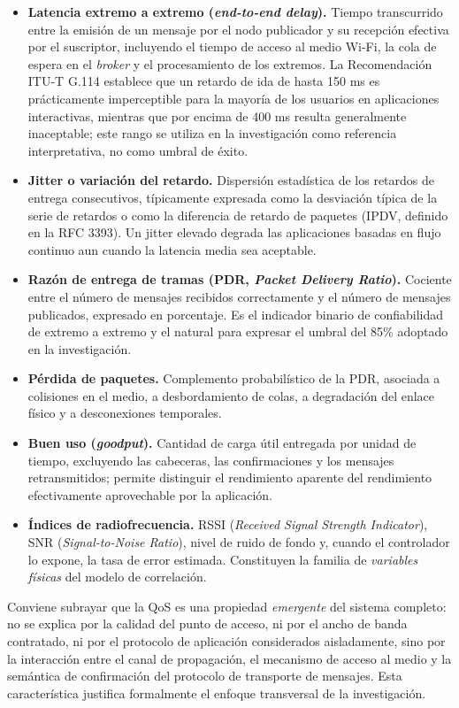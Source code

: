 \documentclass[
  12pt,
]{article}
\providecommand{\tightlist}{%
  \setlength{\itemsep}{0pt}\setlength{\parskip}{0pt}}
\begin{document}
\begin{itemize}
\tightlist
\item
  \textbf{Latencia extremo a extremo (\emph{end-to-end delay}).} Tiempo
  transcurrido entre la emisión de un mensaje por el nodo publicador y
  su recepción efectiva por el suscriptor, incluyendo el tiempo de
  acceso al medio Wi-Fi, la cola de espera en el \emph{broker} y el
  procesamiento de los extremos. La Recomendación ITU-T G.114 establece
  que un retardo de ida de hasta 150 ms es prácticamente imperceptible
  para la mayoría de los usuarios en aplicaciones interactivas, mientras
  que por encima de 400 ms resulta generalmente inaceptable; este rango
  se utiliza en la investigación como referencia interpretativa, no como
  umbral de éxito.
\item
  \textbf{Jitter o variación del retardo.} Dispersión estadística de los
  retardos de entrega consecutivos, típicamente expresada como la
  desviación típica de la serie de retardos o como la diferencia de
  retardo de paquetes (IPDV, definido en la RFC 3393). Un jitter elevado
  degrada las aplicaciones basadas en flujo continuo aun cuando la
  latencia media sea aceptable.
\item
  \textbf{Razón de entrega de tramas (PDR, \emph{Packet Delivery
  Ratio}).} Cociente entre el número de mensajes recibidos correctamente
  y el número de mensajes publicados, expresado en porcentaje. Es el
  indicador binario de confiabilidad de extremo a extremo y el natural
  para expresar el umbral del 85\% adoptado en la investigación.
\item
  \textbf{Pérdida de paquetes.} Complemento probabilístico de la PDR,
  asociada a colisiones en el medio, a desbordamiento de colas, a
  degradación del enlace físico y a desconexiones temporales.
\item
  \textbf{Buen uso (\emph{goodput}).} Cantidad de carga útil entregada
  por unidad de tiempo, excluyendo las cabeceras, las confirmaciones y
  los mensajes retransmitidos; permite distinguir el rendimiento
  aparente del rendimiento efectivamente aprovechable por la aplicación.
\item
  \textbf{Índices de radiofrecuencia.} RSSI (\emph{Received Signal
  Strength Indicator}), SNR (\emph{Signal-to-Noise Ratio}), nivel de
  ruido de fondo y, cuando el controlador lo expone, la tasa de error
  estimada. Constituyen la familia de \emph{variables físicas} del
  modelo de correlación.
\end{itemize}

Conviene subrayar que la QoS es una propiedad \emph{emergente} del
sistema completo: no se explica por la calidad del punto de acceso, ni
por el ancho de banda contratado, ni por el protocolo de aplicación
considerados aisladamente, sino por la interacción entre el canal de
propagación, el mecanismo de acceso al medio y la semántica de
confirmación del protocolo de transporte de mensajes. Esta
característica justifica formalmente el enfoque transversal de la
investigación.
\end{document}
